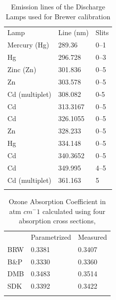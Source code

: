 \documentclass[acp]{copernicus} %
\begin{document}









\begin{table}[t]
\caption{Emission lines of the Discharge Lamps used for Brewer calibration}
\begin{tabular}{lll}
\tophline
Lamp           & Line (nm) & Slits \\
\middlehline
Mercury (Hg)   & 289.36    & 0–1   \\
Hg             & 296.728   & 0–3   \\
Zinc (Zn)      & 301.836   & 0–5   \\
Zn             & 303.578   & 0–5   \\
Cd (multiplet) & 308.082   & 0-5   \\
Cd             & 313.3167  & 0–5   \\
Cd             & 326.1055  & 0–5   \\
Zn             & 328.233   & 0–5   \\
Hg             & 334.148   & 0–5   \\
Cd             & 340.3652  & 0–5   \\
Cd             & 349.995   & 4–5   \\
Cd (multiplet) & 361.163   & 5     \\
\bottomhline
\end{tabular}
\belowtable{} %
\label{tab:dsp_lines}
\end{table}



\begin{table}[t]
\caption{Ozone Absorption Coefficient in atm $cm^-1$ calculated using  four absorption cross sections, }
\begin{tabular}{lll}
\tophline
     & Parametrized & Measured \\
\middlehline
BRW  & 0.3381       & 0.3407   \\
B\&P & 0.3330       & 0.3360    \\
DMB  & 0.3483       & 0.3514   \\
SDK  & 0.3392       & 0.3422    \\
\bottomhline
\end{tabular}
\belowtable{} %
\label{tab:slit_param}
\end{table}
\end{document}
